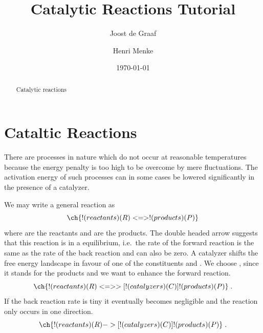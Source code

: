 \documentclass[aip,jcp,reprint,a4paper,onecolumn,nofootinbib,amsmath,amssymb]{revtex4-1}
\begin{document}
\title{Catalytic Reactions Tutorial}
\author{Joost de Graaf}
\author{Henri Menke}
\date{\today}

\begin{abstract}
  Catalytic reactions
\end{abstract}

\maketitle

\section{Cataltic Reactions}

There are processes in nature which do not occur at reasonable
temperatures because the energy penalty is too high to be overcome by
mere fluctuations.  The activation energy of such processes can in
some cases be lowered significantly in the presence of a catalyzer.

We may write a general reaction as
\begin{equation}
  \label{eq:equi}
  \ch{!(reactants)(R) <=> !(products)(P)}
\end{equation}
where  are the reactants and  are the products.  The
double headed arrow suggests that this reaction is in a equilibrium,
i.e.~the rate of the forward reaction is the same as the rate of the
back reaction and can also be zero.  A catalyzer shifts the free
energy landscape in favour of one of the constituents  and
.  We choose , since it stands for the products and we
want to enhance the forward reaction.
\begin{equation}
  \ch{!(reactants)(R) <=>>[ !(catalyzers)(C) ] !(products)(P)} \;.
\end{equation}
If the back reaction rate is tiny it eventually becomes negligible and
the reaction only occurs in one direction.
\begin{equation}
  \label{eq:cat}
  \ch{!(reactants)(R) ->[ !(catalyzers)(C) ] !(products)(P)} \;.
\end{equation}
\end{document}
